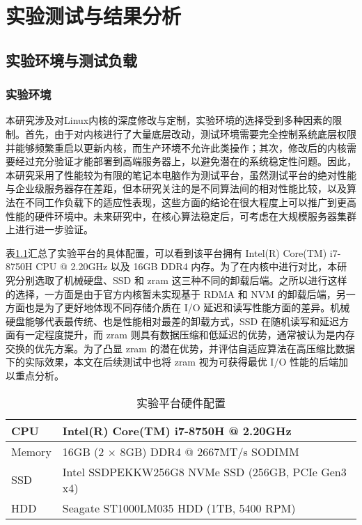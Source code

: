
\chapter{实验测试与结果分析}

\section{实验环境与测试负载}

\subsection{实验环境}

本研究涉及对Linux内核的深度修改与定制，实验环境的选择受到多种因素的限制。首先，由于对内核进行了大量底层改动，测试环境需要完全控制系统底层权限并能够频繁重启以更新内核，而生产环境不允许此类操作；其次，修改后的内核需要经过充分验证才能部署到高端服务器上，以避免潜在的系统稳定性问题。因此，本研究采用了性能较为有限的笔记本电脑作为测试平台，虽然测试平台的绝对性能与企业级服务器存在差距，但本研究关注的是不同算法间的相对性能比较，以及算法在不同工作负载下的适应性表现，这些方面的结论在很大程度上可以推广到更高性能的硬件环境中。未来研究中，在核心算法稳定后，可考虑在大规模服务器集群上进行进一步验证。

表\ref{tab:hardware_config}汇总了实验平台的具体配置，可以看到该平台拥有 Intel(R) Core(TM) i7-8750H CPU @ 2.20GHz 以及 16GB DDR4 内存。为了在内核中进行对比，本研究分别选取了机械硬盘、SSD 和 zram 这三种不同的卸载后端。之所以进行这样的选择，一方面是由于官方内核暂未实现基于 RDMA 和 NVM 的卸载后端，另一方面也是为了更好地体现不同存储介质在 I/O 延迟和读写性能方面的差异。机械硬盘能够代表最传统、也是性能相对最差的卸载方式，SSD 在随机读写和延迟方面有一定程度提升，而 zram 则具有数据压缩和低延迟的优势，通常被认为是内存交换的优先方案。为了凸显 zram 的潜在优势，并评估自适应算法在高压缩比数据下的实际效果，本文在后续测试中也将 zram 视为可获得最优 I/O 性能的后端加以重点分析。

\begin{table}[ht]
    \centering
    \caption{实验平台硬件配置}
    \label{tab:hardware_config}
    \begin{tabular}{ll}
        \toprule
        CPU & Intel(R) Core(TM) i7-8750H @ 2.20GHz \\
        \midrule
        Memory & 16GB (2 \(\times\) 8GB) DDR4 @ 2667MT/s SODIMM \\
        \midrule
        SSD & Intel SSDPEKKW256G8 NVMe SSD (256GB, PCIe Gen3 x4)  \\
        \midrule
        HDD & Seagate ST1000LM035 HDD (1TB, 5400 RPM) \\
        \bottomrule
    \end{tabular}
\end{table}

